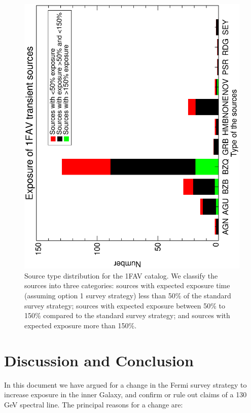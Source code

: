 \documentclass[aps,prd,superscriptaddress,showpacs,nofootinbib,fixlfloat, 12pt]{revtex4-1}
\begin{document}
\begin{figure}[t]
  \begin{center}
    \includegraphics[width=0.7\linewidth, angle=-90]{plots/source_type_hist.ps}
    \vspace{-0.5cm}
  \end{center}
  \caption{Source type distribution for the 1FAV catalog. We classify the sources into three categories: sources with expected exposure time (assuming option 1 survey strategy) less than 50\% of the standard survey strategy; sources with expected exposure between 50\% to 150\% compared to the standard survey strategy; and sources with expected exposure more than 150\%. }
  \label{fig:transhist}
\end{figure}


\section{Discussion and Conclusion}
\label{sec:Conclusion}

In this document we have argued for a change in the Fermi survey strategy to
increase exposure in the inner Galaxy, and confirm or rule out claims of a 130
GeV spectral line.  The principal reasons for a change are:
\end{document}
